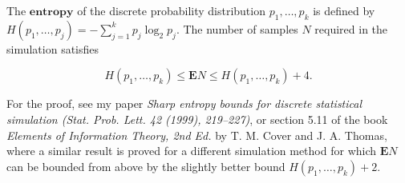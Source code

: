 \begin{thm}
The $\textbf{entropy}$ of the discrete probability
distribution $p_1,\ldots,p_k$ is defined by
$H(p_1,\ldots,p_j) = -\sum_{j=1}^k p_j \log_2 p_j$.
The number of samples $N$ required in the simulation
satisfies

\[
H(p_1,\ldots,p_k) \le \mathbf{E} N \le H(p_1,\ldots,p_k) + 4.
\]

\end{thm}

\noindent For the proof, see my paper \emph{Sharp entropy bounds for
discrete statistical simulation (Stat. Prob. Lett. 42
(1999), 219--227)}, or section 5.11 of the book
\emph{Elements of Information Theory, 2nd Ed.} by T. M.
Cover and J. A. Thomas, where a similar result is
proved for a different simulation method for which
$\mathbf{E} N$ can be bounded from above by the
slightly better bound $H(p_1,\ldots,p_k)+2$.
